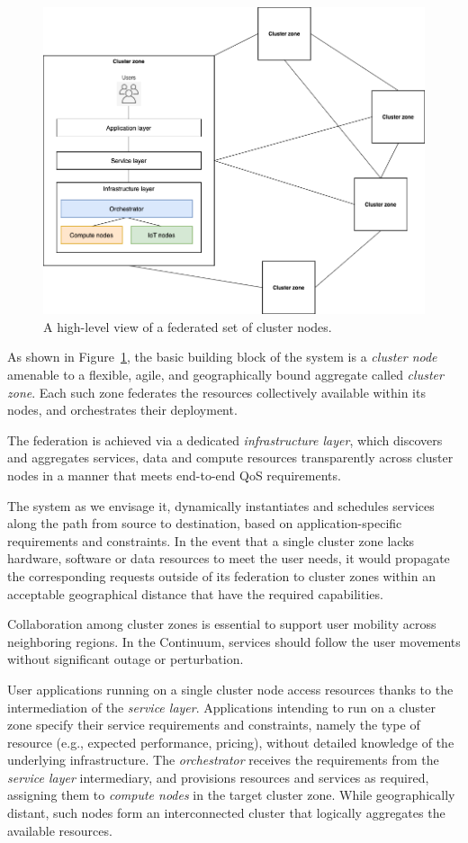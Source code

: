 \begin{figure}[ht]
\centering
\includegraphics[width=0.75\columnwidth]{figures/architecture-federation}
\caption{A high-level view of a federated set of cluster nodes.} \label{fig:architecture-federation}
\end{figure}

As shown in Figure~\ref{fig:architecture-federation}, 
the basic building block of the system is a \textit{cluster node} amenable to a flexible, agile, and geographically bound aggregate called \textit{cluster zone}.
Each such zone federates the resources collectively available within its nodes, and orchestrates their deployment. 

The federation is achieved via a dedicated \textit{infrastructure layer}, which discovers and aggregates services, data and compute resources transparently across cluster nodes in a manner that meets end-to-end QoS requirements.

The system as we envisage it, dynamically instantiates and schedules services along the path from source to destination, based on application-specific requirements and constraints. 
In the event that a single cluster zone lacks hardware, software or data resources to meet the user needs, it would propagate the corresponding requests outside of its federation to cluster zones within an acceptable geographical distance that have the required capabilities.

Collaboration among cluster zones is essential to support user mobility across neighboring regions. 
In the Continuum, services should follow the user movements without significant outage or perturbation.

User applications running on a single cluster node access resources thanks to the intermediation of the \textit{service layer}. Applications intending to run on a cluster zone specify their service requirements and constraints, namely the type of resource (e.g., expected performance, pricing), without detailed knowledge of the underlying infrastructure. 
The \textit{orchestrator} receives the requirements from the \textit{service layer} intermediary, and provisions resources and services as required, assigning them to \textit{compute nodes} in the target cluster zone.
While geographically distant, such nodes form an interconnected cluster that logically aggregates the available resources.

